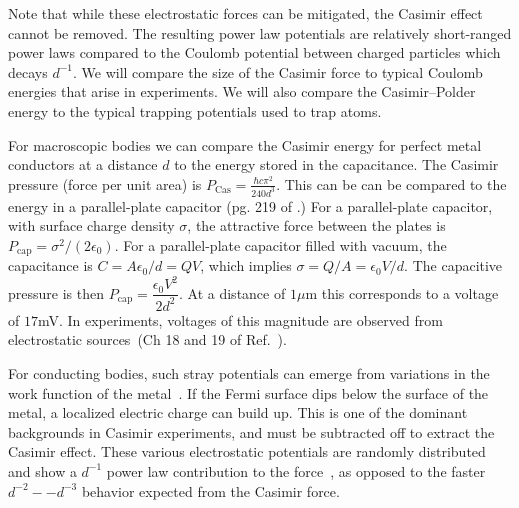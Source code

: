 Note that while these electrostatic forces can be mitigated, the Casimir effect cannot be removed.  
The resulting power law potentials are relatively short-ranged power laws compared to the Coulomb potential 
between charged particles which decays $d^{-1}$. 
We will compare the size of the Casimir force to typical Coulomb energies that arise in experiments.
We will also compare the Casimir--Polder energy to the typical trapping potentials used to trap atoms.
  

For macroscopic bodies we can compare the Casimir energy for perfect 
metal conductors at a distance $d$ to the energy stored in the capacitance.
The Casimir pressure (force per unit area) is $P_{\text{Cas}}=\frac{\hbar c\pi^2}{240 d^3}$.
This can be can be compared to the energy in a parallel-plate capacitor (pg. 219 of \cite{Milonni1994}.)
For a parallel-plate capacitor, with surface charge density $\sigma$, the attractive force 
between the plates is $P_{\text{cap}}=\sigma^2/(2\epsilon_0)$.  For a parallel-plate capacitor filled with
vacuum, the capacitance is $C=A\epsilon_0/d = QV$, which implies $\sigma=Q/A=\epsilon_0V/d$.
The capacitive pressure is then $P_{\text{cap}}= \dfrac{\epsilon_0 V^2}{2d^2}$.  At a distance of $1\mu$m
this corresponds to a voltage of $17$mV.  
In experiments, voltages of this magnitude are observed from electrostatic sources~(Ch 18 and 19 of Ref.~\cite{Bordag2009}).

For conducting bodies, such stray potentials can emerge from variations in the work function
of the metal~\cite{Lamoreaux2011}.
If the Fermi surface dips below the surface of the metal, a localized electric charge can build up.
This is one of the dominant backgrounds in Casimir experiments, and must be subtracted off to extract the Casimir effect.
These various electrostatic potentials are randomly distributed and show a $d^{-1}$ power law
contribution to the force~\cite{Sushkov2011}, as opposed to the faster $d^{-2}--d^{-3}$ behavior expected
from the Casimir force.  

